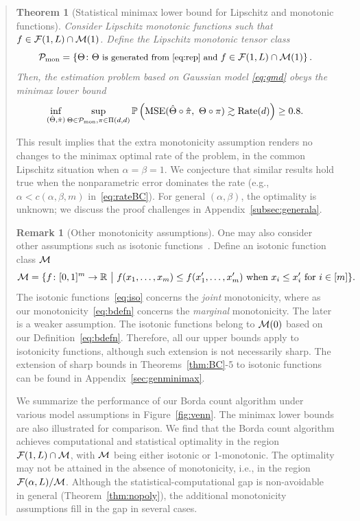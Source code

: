 \documentclass[11pt]{article}
\theoremstyle{plain}
\newtheorem{thm}{Theorem}[section]
\theoremstyle{definition}
\newtheorem{rmk}{Remark}
\begin{document}
\begin{enumerate}[wide, labelwidth=!, labelindent=0pt]
\begin{quote}
{\begin{thm}[Statistical minimax lower bound for Lipschitz  and monotonic functions]\label{thm:mminimax}
Consider Lipschitz monotonic functions such that  $f\in\mathcal{F}(1,L)\cap \mathcal{M}(1)$. Define the Lipschitz monotonic tensor class 
\[
{\small \mathcal{P}_{\textup{mon}} = \left\{\Theta\colon \Theta \text{ is generated from~\eqref{eq:rep}} \text{ and } f\in\mathcal{F}(1,L)\cap \mathcal{M}(1)\right\}.}
\]
Then, the estimation problem based on Gaussian model \eqref{eq:gmd} obeys the minimax lower bound
\begin{align}
    \inf_{(\hat\Theta,\hat\pi)}\sup_{\Theta\in\tP_{\textup{mon}},\pi\in\Pi(d,d)}\mathbb{P}\left(\textup{MSE}(\hat\Theta\circ\hat\pi,\ \Theta\circ\pi) \gtrsim \textup{Rate}(d) \right) \geq 0.8.
\end{align}
\end{thm}
This result implies that the extra monotonicity assumption renders no changes to the minimax optimal rate of the problem, in the common Lipschitz situation when $\alpha=\beta=1$. We conjecture that similar results hold true when the nonparametric error dominates the rate (e.g., $\alpha<c(\alpha,\beta,m)$ in~\eqref{eq:rateBC}). For general $(\alpha,\beta)$, the optimality is unknown; we discuss the proof challenges in Appendix~\ref{subsec:generala}.  


\begin{rmk}[Other monotonicity assumptions]\label{rmk:BC2}
One may also consider other assumptions such as isotonic functions~\citep{pananjady2022isotonic}. 
Define an isotonic function class $\mathcal{M}$ 
\begin{align}\label{eq:iso}
    \tM = \{f\colon[0,1]^m\rightarrow\mathbb{R}\ \big|\ f(x_1,\ldots,x_m)\leq f(x_1',\ldots,x_m')\text{ when } x_i\leq x_i' \text{ for } i\in[m]\}.
\end{align}
The isotonic functions~\eqref{eq:iso} concerns the \emph{joint} monotonicity, where as our monotonicity~\eqref{eq:bdefn} concerns the \emph{marginal} monotonicity. The later is a weaker assumption. The isotonic functions belong to $\mathcal{M}(0)$ based on our Definition~\ref{eq:bdefn}. Therefore, all our upper bounds apply to isotonicity functions, although such extension is not necessarily sharp. The extension of sharp bounds in Theorems~\ref{thm:BC}-5 to isotonic functions can be found in Appendix~\ref{sec:genminimax}.
\end{rmk}


We summarize the performance of our Borda count algorithm under various model assumptions in Figure~\ref{fig:venn}. The minimax lower bounds are also illustrated for comparison. We find that the Borda count algorithm achieves computational and statistical optimality in the region $\mathcal{F}(1,L)\cap \mathcal{M}$, with $\mathcal{M}$ being either isotonic or 1-monotonic. The optimality may not be attained in the absence of monotonicity, i.e., in the region $\mathcal{F}(\alpha,L)/\mathcal{M}$. Although the statistical-computational gap is non-avoidable in general (Theorem~\ref{thm:nopoly}), the additional monotonicity assumptions fill in the gap in several cases.

}
\end{quote}
\end{enumerate}
\end{document}
